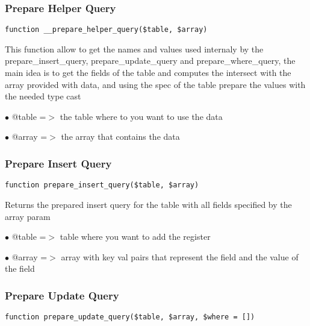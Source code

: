 \documentclass[a4paper]{article}
\begin{document}
\hypertarget{toc233}{}
\subsubsection{Prepare Helper Query}

\begin{lstlisting}
function __prepare_helper_query($table, $array)
\end{lstlisting}

This function allow to get the names and values used internaly by the
prepare\_insert\_query, prepare\_update\_query and prepare\_where\_query, the
main idea is to get the fields of the table and computes the intersect
with the array provided with data, and using the spec of the table
prepare the values with the needed type cast

\begin{compactitem}
\item[\color{myblue}$\bullet$] @table =$>$ the table where to you want to use the data
\item[\color{myblue}$\bullet$] @array =$>$ the array that contains the data
\end{compactitem}

\hypertarget{toc234}{}
\subsubsection{Prepare Insert Query}

\begin{lstlisting}
function prepare_insert_query($table, $array)
\end{lstlisting}

Returns the prepared insert query for the table with all fields specified
by the array param

\begin{compactitem}
\item[\color{myblue}$\bullet$] @table =$>$ table where you want to add the register
\item[\color{myblue}$\bullet$] @array =$>$ array with key val pairs that represent the field and the value
          of the field
\end{compactitem}

\hypertarget{toc235}{}
\subsubsection{Prepare Update Query}

\begin{lstlisting}
function prepare_update_query($table, $array, $where = [])
\end{lstlisting}
\end{document}
